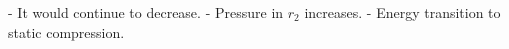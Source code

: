 - It would continue to decrease.
- Pressure in \( r_2 \) increases.
- Energy transition to static compression.